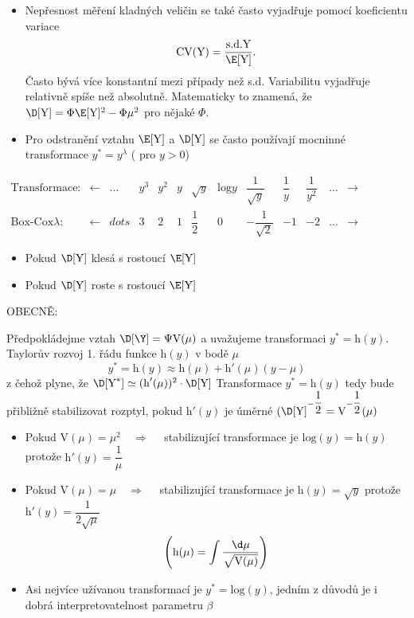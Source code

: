 \begin{itemize}
\item Nepřesnost měření kladných veličin se také často vyjadřuje pomocí koeficientu variace
$$
 \text{CV}(\text{Y}) = \frac{\text{s.d.} \text{Y}}{\E[\text{Y}]}.
$$
Často bývá více konstantní mezi případy než s.d. Variabilitu vyjadřuje relativně spíše než absolutně. Matematicky to znamená, že $ \D[\text{Y}] = \Phi \E[\text{Y}]^2 - \Phi \mu^2 $ pro nějaké $ \Phi $.
\item Pro odstranění vztahu $ \E [\text{Y}] $ a $ \D[\text{Y}] $ se často používají mocninné transformace $ y^* = y^{\lambda} $ ( pro $ y > 0 $)
\end{itemize}

\begin{table}[h]
\centering
$\begin{array}{ *{13}{c} }
\text{Transformace:} & \leftarrow & \dots &  y^3 &  y^2 &  y & \sqrt{y}  & \text{log}y & \dfrac{1}{\sqrt{y}}  & \dfrac{1}{y} & \dfrac{1}{y^2} & \dots  & \rightarrow \\
\text{Box-Cox} \lambda : &\leftarrow  & dots & 3 & 2 & 1 & \dfrac{1}{2}  & 0 &  -\dfrac{1}{\sqrt{2}} & -1 & -2 & \dots & \rightarrow
\end{array}$
\end{table}

\begin{itemize}
\item Pokud $ \D[\text{Y}] $ klesá s rostoucí $ \E[\text{Y}] $
\item Pokud $ \D[\text{Y}] $ roste s rostoucí $ \E[\text{Y}] $
\end{itemize}

OBECNĚ:

Předpokládejme vztah $ \D[\Y] = \Psi \text{V}(\mu) $ a uvažujeme transformaci $ y^* = \text{h}(y) $. Taylorův rozvoj 1. řádu funkce $ \text{h}(y) $ v bodě $ \mu $
$$  
 y^* = \text{h}(y) \approx \text{h}(\mu) + \text{h}'(\mu)(y-\mu)
$$
z čehož plyne, že $ \D[\text{Y}^*] \simeq ( \text{h}'(\mu) )^2 \cdot \D[\text{Y}] $
Transformace $  y^* = \text{h}(y) $ tedy bude přibližně stabilizovat rozptyl, pokud $ \text{h}'(y) $ je úměrné $ (\D[\text{Y}]^{-\dfrac{1}{2}} = \text{V}^{-\dfrac{1}{2}}(\mu) $

\begin{itemize}
\item Pokud $ \text{V}(\mu) = \mu^2 \quad \Rightarrow \quad $ stabilizující transformace je $ \text{log}(y) = \text{h}(y) $ protože $ \text{h}'(y) = \dfrac{1}{\mu} $
\item Pokud $ \text{V}(\mu) = \mu \quad \Rightarrow \quad $ stabilizující transformace je $ \text{h}(y) = \sqrt{y} $ protože $ \text{h}'(y) = \dfrac{1}{2 \sqrt{\mu}} $
$$  
 \left( \text{h}(\mu) =  \int \frac{\d \mu}{\sqrt{\text{V}(\mu)}} \right)
$$
\item Asi nejvíce užívanou transformací je $ y^* = \text{log}(y) $, jedním z důvodů je i dobrá interpretovatelnost parametru $ \beta $
\end{itemize}

